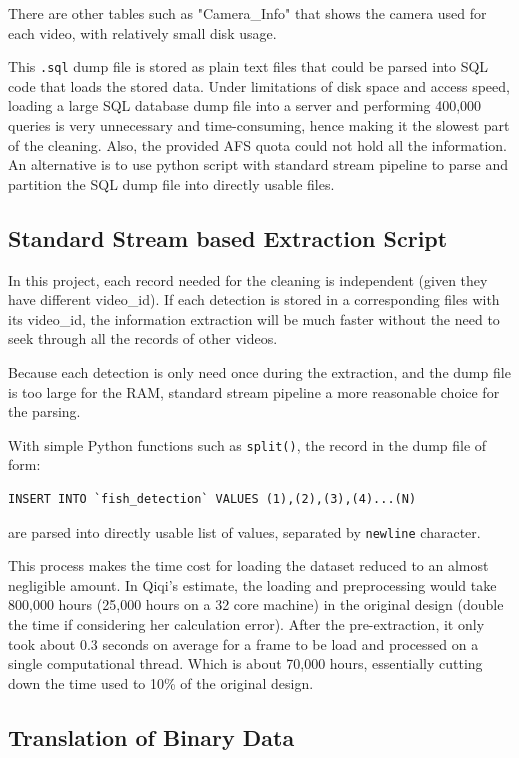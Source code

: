 \documentclass[bsc,logo,twoside,fullspacing,parskip]{infthesis}
\begin{document}
There are other tables such as "Camera\_Info" that shows the camera used for each video, with relatively small disk usage.

This {\tt .sql} dump file is stored as plain text files that could be parsed into SQL code that loads the stored data.
Under limitations of disk space and access speed, loading a large SQL database dump file into a server and performing 400,000 queries is very unnecessary and time-consuming, hence making it the slowest part of the cleaning. Also, the provided AFS quota could not hold all the information. 
An alternative is to use python script with standard stream pipeline to parse and partition the SQL dump file into directly usable files.

\subsection{Standard Stream based Extraction Script}

In this project, each record needed for the cleaning is independent (given they have different video\_id). 
If each detection is stored in a corresponding files with its video\_id, the information extraction will be much faster without the need to seek through all the records of other videos.

Because each detection is only need once during the extraction, and the dump file is too large for the RAM, standard stream pipeline a more reasonable choice for the parsing. 

With simple Python functions such as {\tt split()}, the record in the dump file of form:
\lstset{basicstyle=\small\ttfamily,breaklines=true,style=sql}
\begin{lstlisting}[frame=single]
 INSERT INTO `fish_detection` VALUES (1),(2),(3),(4)...(N)
\end{lstlisting}
are parsed into directly usable list of values, separated by {\tt newline} character.

This process makes the time cost for loading the dataset reduced to an almost negligible amount. In Qiqi's estimate, the loading and preprocessing would take 800,000 hours (25,000 hours on a 32 core machine) in the original design (double the time if considering her calculation error). After the pre-extraction, it only took about 0.3 seconds on average for a frame to be load and processed on a single computational thread. Which is about 70,000 hours, essentially cutting down the time used to 10\% of the original design.

\subsection{Translation of Binary Data} 
\end{document}
